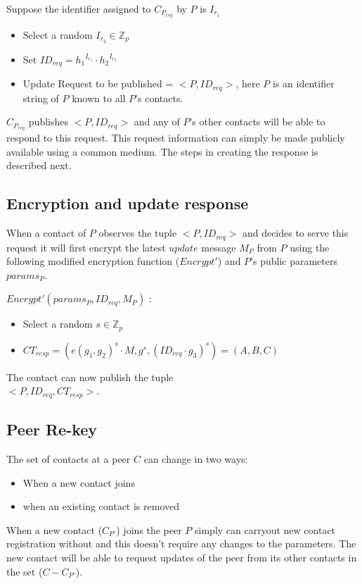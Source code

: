 Suppose the identifier assigned to $C_{P_{req}}$ by $P$ is $I_{r_1}$
\begin{itemize}
\item Select a random $I_{r_2}\in \mathbb{Z}_p$
\item Set $ID_{req} = {h_1}^{I_{r_1}} \cdot {h_2}^{I_{r_2}}$
\item Update Request to be published  = $<P, ID_{req}>$, here $P$ is an identifier string of $P$ known to all $P$'s contacts.
\end{itemize}

$C_{P_{req}}$ publishes $<P, ID_{req}>$ and any of $P$'s other contacts will be able to respond to this request. This request information can simply be made publicly available using a common medium. The steps in creating the response is described next.

\subsection{Encryption and update response}
When a contact of $P$ observes the tuple $<P, ID_{req}>$ and decides to serve this request it will first encrypt the latest $update$ message $M_P$ from $P$ using the following modified encryption function ($Encrypt'$) and $P$'s public parameters $params_P$. 

$Encrypt' (params_P, ID_{req}, M_P)$ :

\begin{itemize}
	\item Select a random $s \in \mathbb{Z}_p$ 
	\item $CT_{resp} = (e(g_1, g_2)^s \cdot M,  g^s,  {({ID_{req}} \cdot {g_3})}^s) = (A, B, C)$
\end{itemize}

The contact can now publish the tuple \\$<P, ID_{req}, CT_{resp}>$.


\subsection{Peer Re-key}
The set of contacts at a peer $C$ can change in two ways:
\begin{itemize}
\item When a new contact joins
\item when an existing contact is removed
\end{itemize}

When a new contact ($C_{P'}$) joins the peer $P$ simply can carryout new contact registration without and this doesn't require any changes to the parameters. The new contact will be able to request updates of the peer from its other contacts in the set ($C - C_{P'}$). 

